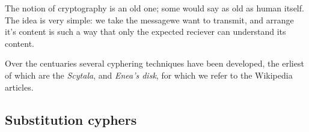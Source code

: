 \documentclass{subfiles}
\begin{document}
    The notion of cryptography is an old one; some would say as old as human itself.
        The idea is very simple: we take the messagewe want to transmit,
        and arrange it's content is such a way that only the expected reciever can understand its content.

    Over the centuaries several cyphering techniques have been developed,
        the erliest of which are the \emph{Scytala}, and \emph{Enea's disk},
        for which we refer to the Wikipedia articles.

    \subsection{Substitution cyphers}
    
    \clearpage
\end{document}
